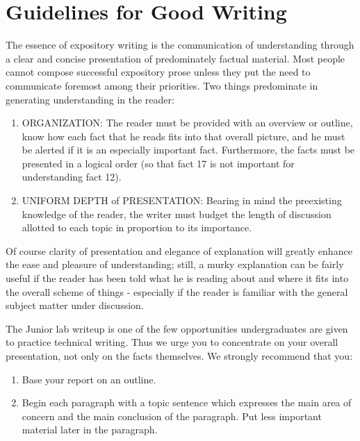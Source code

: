 \section{Guidelines for Good Writing \cite{pritchard1990}}

The essence of expository writing is the communication of
understanding through a clear and concise presentation of
predominately factual material. Most people cannot compose
successful expository prose unless they put the need to communicate
foremost among their priorities. Two things predominate in
generating understanding in the reader:
\begin{enumerate}
\item ORGANIZATION: The reader must be provided with an overview or
outline, know how each fact that he reads fits into that overall
picture, and he must be alerted if it is an especially important
fact. Furthermore, the facts must be presented in a logical order
(so that fact 17 is not important for understanding fact 12).

\item UNIFORM DEPTH of PRESENTATION: Bearing in mind the preexisting
knowledge of the reader, the writer must budget the length of
discussion allotted to each topic in proportion to its importance.

\end{enumerate}

Of course clarity of presentation and elegance of explanation will
greatly enhance the ease and pleasure of understanding; still, a
murky explanation can be fairly useful if the reader has been told
what he is reading about and where it fits into the overall scheme
of things - especially if the reader is familiar with the general
subject matter under discussion.

The Junior lab writeup is one of the few opportunities
undergraduates are given to practice technical writing. Thus we urge
you to concentrate on your overall presentation, not only on the
facts themselves. We strongly recommend that you:
\begin{enumerate}
\item Base your report on an outline.
\item Begin each paragraph with a topic sentence which expresses the
main area of concern and the main conclusion of the paragraph. Put
less important material later in the paragraph.
\end{enumerate}

